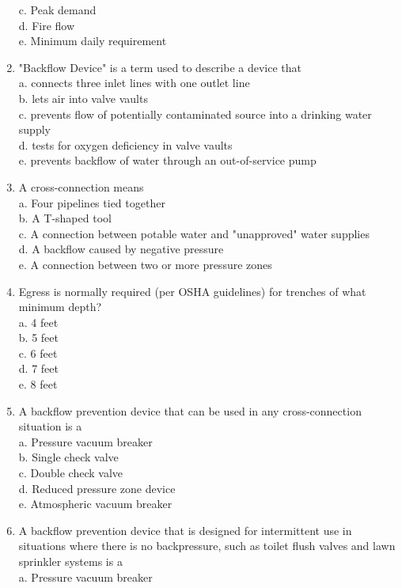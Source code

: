 \begin{enumerate}[1.]
c. Peak demand\\
d. Fire flow\\
e. Minimum daily requirement\\
\item "Backflow Device" is a term used to describe a device that\\
a. connects three inlet lines with one outlet line\\
b. lets air into valve vaults\\
c. prevents flow of potentially contaminated source into a drinking water supply\\
d. tests for oxygen deficiency in valve vaults\\
e. prevents backflow of water through an out-of-service pump\\
\item A cross-connection means\\
a. Four pipelines tied together\\
b. A T-shaped tool\\
c. A connection between potable water and "unapproved" water supplies\\
d. A backflow caused by negative pressure\\
e. A connection between two or more pressure zones\\
\item Egress is normally required (per OSHA guidelines) for trenches of what minimum depth?\\
a. 4 feet\\
b. 5 feet\\
c. 6 feet\\
d. 7 feet\\
e. 8 feet\\
\item A backflow prevention device that can be used in any cross-connection situation is a\\
a. Pressure vacuum breaker\\
b. Single check valve\\
c. Double check valve\\
d. Reduced pressure zone device\\
e. Atmospheric vacuum breaker\\
\item A backflow prevention device that is designed for intermittent use in situations where there is no backpressure, such as toilet flush valves and lawn sprinkler systems is a\\
a. Pressure vacuum breaker\\

\end{enumerate}
